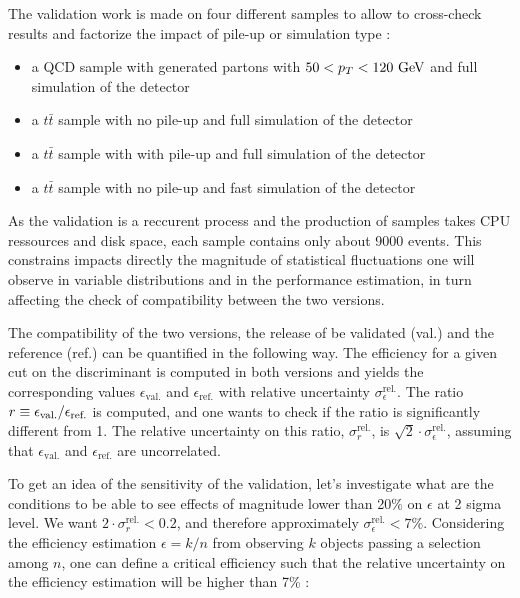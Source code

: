     The validation work is made on four different samples to allow to cross-check results
    and factorize the impact of pile-up or simulation type :
    \begin{itemize}
        \item a QCD sample with generated partons with $50 < p_T < 120~\text{GeV}$ and full simulation
        of the detector
        \item a $t\bar{t}$ sample with no pile-up and full simulation of the detector
        \item a $t\bar{t}$ sample with with pile-up and full simulation of the detector
        \item a $t\bar{t}$ sample with no pile-up and fast simulation of the detector
    \end{itemize}

    As the validation is a reccurent process and the production of samples takes CPU
    ressources and disk space, each sample contains only about 9000 events. This constrains
    impacts directly the magnitude of statistical fluctuations one will observe in
    variable distributions and in the performance estimation, in turn affecting the check of compatibility
    between the two versions.

    The compatibility of the two versions, the release of be validated (val.) and the
    reference (ref.) can be quantified in the following way. The efficiency for a given
    cut on the discriminant is computed in both versions and yields the corresponding
    values $\epsilon_\text{val.}$ and $\epsilon_\text{ref.}$ with relative uncertainty
    $\sigma^\text{rel.}_\epsilon$. The ratio $r \equiv \epsilon_\text{val.}/\epsilon_\text{ref.}$
    is computed, and one wants to check if the ratio is significantly different from 1.
    The relative uncertainty on this ratio, $\sigma^\text{rel.}_r$, is $\sqrt{2} \cdot \sigma^\text{rel.}_\epsilon$,
    assuming that $\epsilon_\text{val.}$ and $\epsilon_\text{ref.}$ are uncorrelated.

    To get an idea of the sensitivity of the validation, let's investigate what are the
    conditions to be able to see effects of magnitude lower than 20\% on $\epsilon$ at 2
    sigma level. We want $2 \cdot \sigma^\text{rel.}_r < 0.2$, and therefore approximately
    $\sigma^\text{rel.}_\epsilon < 7\%$. Considering the efficiency estimation $\epsilon
    = k/n$ from observing $k$ objects passing a selection among $n$, one can define a
    critical efficiency such that the relative uncertainty on the efficiency estimation
    will be higher than 7\% :

